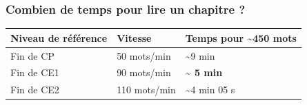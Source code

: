 \documentclass[
  french,
  french,
  14pt,
  a4paper]{extarticle}
\newcounter{none} %
\begin{document}
\subsubsection{Combien de temps pour lire un chapitre
?}\label{combien-de-temps-pour-lire-un-chapitre-3}

{\def\LTcaptype{none} %
\begin{longtable}[]{@{}lll@{}}
\toprule\noalign{}
Niveau de référence & Vitesse & Temps pour \textasciitilde450 mots \\
\midrule\noalign{}
\endhead
\bottomrule\noalign{}
\endlastfoot
Fin de CP & 50 mots/min & \textasciitilde9 min \\
Fin de CE1 & 90 mots/min & \textbf{\textasciitilde{} 5 min} \\
Fin de CE2 & 110 mots/min & \textasciitilde4 min 05 s \\
\end{longtable}
}
\end{document}
